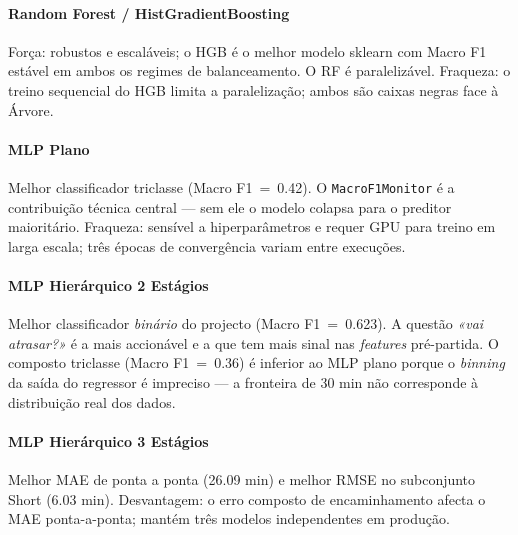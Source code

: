 \documentclass[conference]{IEEEtran}
\begin{document}
\paragraph{Random Forest / HistGradientBoosting} Força: robustos e escaláveis;
o HGB é o melhor modelo sklearn com Macro F1 estável em ambos os regimes de
balanceamento. O RF é paralelizável. Fraqueza: o treino sequencial do HGB limita
a paralelização; ambos são caixas negras face à Árvore.

\paragraph{MLP Plano} Melhor classificador triclasse (Macro F1~=~0.42). O
\texttt{MacroF1Monitor} é a contribuição técnica central — sem ele o modelo
colapsa para o preditor maioritário. Fraqueza: sensível a hiperparâmetros e
requer GPU para treino em larga escala; três épocas de convergência variam
entre execuções.

\paragraph{MLP Hierárquico 2 Estágios} Melhor classificador \emph{binário}
do projecto (Macro F1~=~0.623). A questão \textit{«vai atrasar?»} é a mais
accionável e a que tem mais sinal nas \textit{features} pré-partida. O composto
triclasse (Macro F1~=~0.36) é inferior ao MLP plano porque o \textit{binning}
da saída do regressor é impreciso — a fronteira de 30 min não corresponde à
distribuição real dos dados.

\paragraph{MLP Hierárquico 3 Estágios} Melhor MAE de ponta a ponta (26.09 min)
e melhor RMSE no subconjunto Short (6.03 min). Desvantagem: o erro composto de
encaminhamento afecta o MAE ponta-a-ponta; mantém três modelos independentes
em produção.
\end{document}
